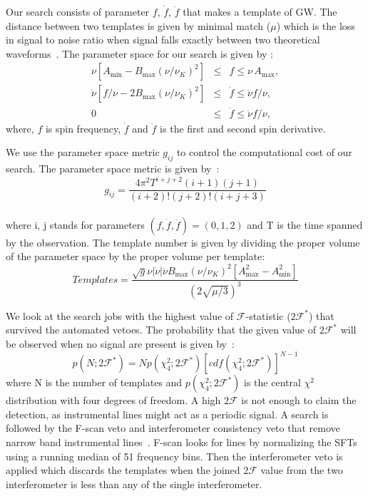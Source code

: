 \documentclass{ttuthes2007}
\begin{document}
Our search consists of parameter $f$, $\dot{f}$, $\ddot{f}$ that makes a
template of \ac{GW}. The distance between two templates is given by minimal
match ($\mu$) which is the loss in signal to noise ratio when signal falls
exactly between two theoretical waveforms~\cite{Owen:1995tm}.  
The parameter space for our search is given by \citet{Caride2019}:
\begin{eqnarray}
\nu \left[ A_{\min} - B_{\max} \left( \nu/\nu_K \right)^2 \right] & \le & f
\le \nu\, A_{\max},
\\
\dot\nu \left[ f/\nu - 2B_{\max} \left( \nu/\nu_K \right)^2 \right] & \le &
\dot f \le \dot\nu f/\nu,
\\
0 & \le & \ddot f \le \ddot\nu f/\nu,
\end{eqnarray}
where, $f$ is spin frequency, $\dot{f}$ and $\ddot{f}$ is the first and second
spin derivative.

We use the parameter space metric $g_{ij}$ to control the computational
cost of our search. 
The parameter space metric is given by~\cite{Wette:2008hg,Owen:1995tm}:
\begin{equation}
g_{ij}=\frac{4\pi^2T^{i+j+2}(i+1)(j+1)}{(i+2)!(j+2)!(i+j+3)}
\end{equation}\\
where i, j stands for parameters $(f,\dot{f},\ddot{f})=(0,1,2)$ and T is the time spanned by the observation. 
The template number is given by dividing the proper volume of the parameter
space by the proper volume per template:~\cite{Caride2019}
\begin{equation}\label{templatescalc}
Templates = \frac{\sqrt{g} \nu \left| \dot\nu \right| \ddot\nu B_{\max} \left(
\nu/\nu_K
\right)^2 \left[ A_{\max}^2 - A_{\min}^2 \right]}{\left( 2 \sqrt{\mu/3}
\right)^3}
\end{equation}

We look at the search jobs with the highest value of $\mathcal{F}$-statistic
($2\mathcal{F}^*$) that survived the automated vetoes. The probability that the
given value of $2\mathcal{F}^*$ will be observed when no signal are present is
given by~\cite{Abadie_2010}: 
\begin{equation} 
p(N;2\mathcal{F}^*)= Np(\chi^2_4;2\mathcal{F}^*)[cdf(\chi^2_4;2\mathcal{F}^*)]^{N-1} 
\end{equation} 
where N is the number of templates and $p(\chi^2_4;2\mathcal{F}^*)$ is the
central $\chi^2$ distribution with four degrees of freedom.  A high
$2\mathcal{F}$ is not enough to claim the detection, as instrumental lines might
act as a periodic signal. A search is followed by the F-scan veto and
interferometer consistency veto that remove narrow band instrumental
lines~\cite{Lindblom_2020}. F-scan looks for lines by normalizing the
\acp{SFT}  using a running median of 51 frequency bins.  Then the interferometer
veto is applied which discards the templates when the joined $2\mathcal{F}$
value from the two interferometer is less than any of the single interferometer.
\end{document}
